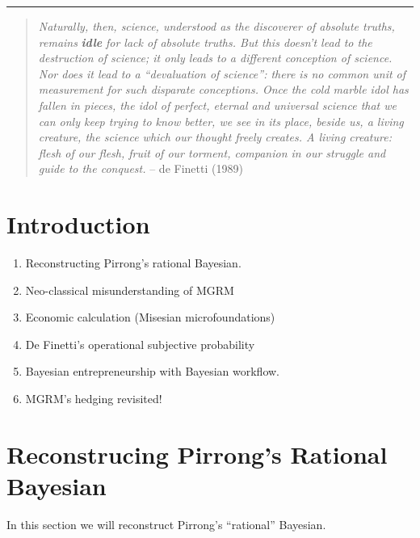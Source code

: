 \documentclass[
  letterpaper,
  DIV=11,
  numbers=noendperiod]{scrartcl}
\providecommand{\tightlist}{%
  \setlength{\itemsep}{0pt}\setlength{\parskip}{0pt}}\usepackage{longtable,booktabs,array}
\begin{document}
\begin{center}\rule{0.5\linewidth}{0.5pt}\end{center}

\begin{quote}
\emph{Naturally, then, science, understood as the discoverer of absolute
truths, remains} \textbf{\emph{idle}} \emph{for lack of absolute truths.
But this doesn't lead to the destruction of science; it only leads to a
different conception of science. Nor does it lead to a ``devaluation of
science'': there is no common unit of measurement for such disparate
conceptions. Once the cold marble idol has fallen in pieces, the idol of
perfect, eternal and universal science that we can only keep trying to
know better, we see in its place, beside us, a living creature, the
science which our thought freely creates. A living creature: flesh of
our flesh, fruit of our torment, companion in our struggle and guide to
the conquest.} -- de Finetti (1989)
\end{quote}

\newpage

\section{Introduction}\label{introduction}

\begin{enumerate}
\def\labelenumi{\arabic{enumi}.}
\tightlist
\item
  Reconstructing Pirrong's rational Bayesian.
\item
  Neo-classical misunderstanding of MGRM
\item
  Economic calculation (Misesian microfoundations)
\item
  De Finetti's operational subjective probability
\item
  Bayesian entrepreneurship with Bayesian workflow.
\item
  MGRM's hedging revisited!
\end{enumerate}

\newpage

\section{Reconstrucing Pirrong's Rational
Bayesian}\label{reconstrucing-pirrongs-rational-bayesian}

In this section we will reconstruct Pirrong's ``rational'' Bayesian.

\newpage
\end{document}
